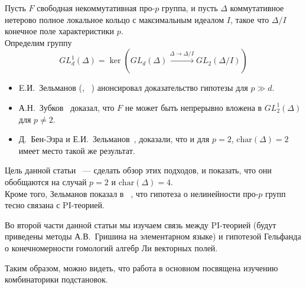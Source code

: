 \noindent
Пусть $F$ свободная некоммутативная про-$p$ группа, и пусть $\Delta$ коммутативное нетерово полное локальное кольцо с максимальным идеалом $I$, такое что
$\Delta/I$ конечное поле характеристики $p$.\\
Определим группу
\[GL_d^1(\Delta) = \ker\left( GL_d(\Delta) \xrightarrow{\Delta\to\Delta/I} GL_2(\Delta/I) \right)\]
\begin{itemize}
    \item E.И.\ Зельманов (\cite{Zelmanov1}, ~\cite{Zelmanov2}) анонсировал доказательство гипотезы для $p\gg d$.
    \item А.Н.\ Зубков~\cite{Zubkov} доказал, что $F$ не может быть непрерывно вложена в $GL_2^1(\Delta)$ для $p\neq2$.
    \item Д.\ Бен-Эзра и Е.И.\ Зельманов~\cite{Ben-Ezra-Zelmanov}, доказали, что и для $p=2$, $\mathrm{char}(\Delta)=2$ имеет место такой же результат.
\end{itemize}

Цель данной статьи ~--- сделать обзор этих подходов, и показать, что они обобщаются на случай $p=2$ и $\mathrm{char}(\Delta)=4$.\\
Кроме того, Зельманов показал в ~\cite{Zelmanov1}, что гипотеза о нелинейности про-$p$ групп тесно связана с PI-теорией.

Во второй части данной статьи мы изучаем связь между PI-теорией (будут приведены методы А.В.\ Гришина на элементарном языке)
и гипотезой Гельфанда о конечномерности гомологий алгебр Ли векторных полей.

Таким образом, можно видеть, что работа в основном посвящена изучению комбинаторики подстановок.